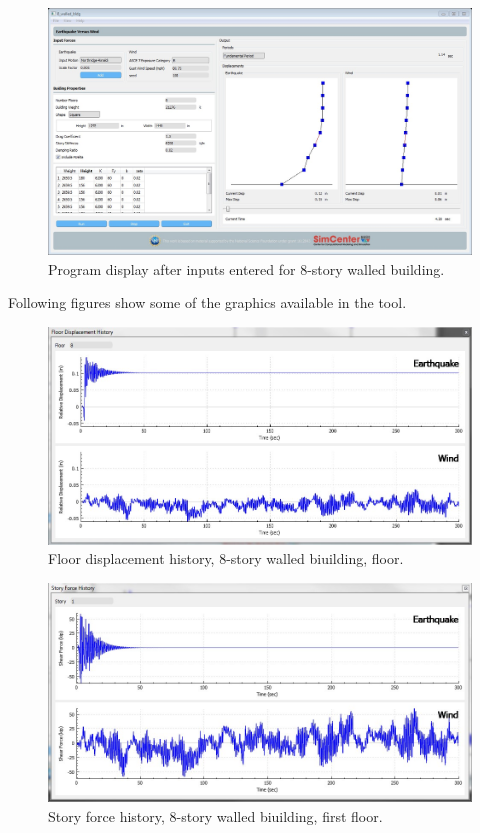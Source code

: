 \documentclass[onecolumn, fleqn]{article}
\begin{document}
\begin{figure}[H]
	\centering \includegraphics[width=0.9\linewidth]{8_walled_bldg_1.JPG}
	\caption{Program display after inputs entered for 8-story walled building.}
\end{figure}
Following figures show some of the graphics available in the tool.
\begin{figure}[H]
	\centering \includegraphics[scale=0.35]{8_walled_bldg_fdh.JPG}
	\caption{Floor displacement history, 8-story walled biuilding,  floor.}
\end{figure}
\begin{figure}[H]
	\centering \includegraphics[scale=0.35]{8_walled_bldg_sfh.JPG}
	\caption{Story force history, 8-story walled biuilding, first floor.}
\end{figure}
\end{document}
